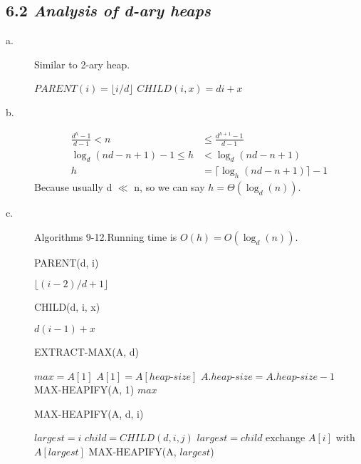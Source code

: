 \documentclass[10pt]{article}
\begin{document}
\subsection*{6.2 \textit{\textbf{Analysis of d-ary heaps}}}
\begin{description}
\item[a. ] Similar to 2-ary heap.
  \begin{algorithmic}
    \STATE $PARENT(i) = \lfloor {i/d} \rfloor$
    \STATE $CHILD(i, x) = di+x$ 
  \end{algorithmic}

\item[b. ]
  \begin{align*}
    \frac{d^h-1}{d-1} < n &\le \frac{d^{h+1}-1}{d-1}\\
    \log_d(nd-n+1)-1 \le h &< \log_d(nd-n+1)\\
    h &= \lceil {\log_h(nd-n+1)} \rceil - 1
  \end{align*}
  Because usually d $\ll$ n, so we can say $h = \Theta(\log_d(n))$.



\item[c. ] Algorithms 9-12.Running time is $O(h) = O(\log_d(n))$.

  \begin{algorithm}
    \caption{PARENT(d, i)}
    \begin{algorithmic}[1]
      \RETURN $\lfloor {(i-2)/d+1} \rfloor$
    \end{algorithmic}
  \end{algorithm}

  \begin{algorithm}
    \caption{CHILD(d, i, x)}
    \begin{algorithmic}
      \RETURN $d(i-1)+x$
    \end{algorithmic}
  \end{algorithm}

  \begin{algorithm}
    \caption{EXTRACT-MAX(A, d)}
    \begin{algorithmic}[1]
      \STATE $max = A[1]$
      \STATE $A[1] = A[heap\textrm{-}size]$
      \STATE $A.heap\textrm{-}size = A.heap\textrm{-}size - 1$
      \STATE MAX-HEAPIFY(A, 1)
      \RETURN $max$
    \end{algorithmic}
  \end{algorithm}

  \begin{algorithm}
    \caption{MAX-HEAPIFY(A, d, i)}
    \begin{algorithmic}[1]
      \STATE $largest = i$
      \STATE $child = CHILD(d, i, j)$
      \STATE $largest = child$
      \ENDIF
      \ENDFOR
      \STATE exchange $A[i]$ with $A[largest]$
      \STATE MAX-HEAPIFY(A, $largest$)
      \ENDIF
    \end{algorithmic}
  \end{algorithm}



\end{description}
\end{document}

